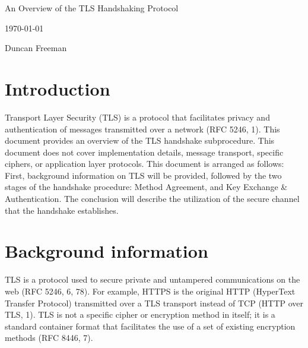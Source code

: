 \documentclass[12pt]{article}
\newcommand{\sectionheaderfmt}[1]{%
    \sffamily\bfseries\strut\color{white}#1
}
\newcommand{\titlebox}[2]{%
    \colorbox{#1}{%
        \sectionheaderfmt{#2}%
}}
\begin{document}
\noindent
\titlebox{sectioncolor}{\large An Overview of the TLS Handshaking Protocol\hspace{5em}}

\medskip
\noindent
\titlebox{sectioncolor}{\large\today}

\medskip
\noindent
\titlebox{sectioncolor}{\large Duncan Freeman}

\thispagestyle{empty}

\newpage


\setcounter{page}{2}

\sffamily\tableofcontents\rmfamily

\newpage


\sffamily\bfseries\listoffigures\rmfamily\mdseries

\newpage



\section{Introduction}
Transport Layer Security (TLS) is a protocol that facilitates privacy and authentication of messages transmitted over a network (RFC 5246, 1). This document provides an overview of the TLS handshake subprocedure. This document does not cover implementation details, message transport, specific ciphers, or application layer protocols. This document is arranged as follows: First, background information on TLS will be provided, followed by the two stages of the handshake procedure: Method Agreement, and Key Exchange \& Authentication. The conclusion will describe the utilization of the secure channel that the handshake establishes. 

\section{Background information}
TLS is a protocol used to secure private and untampered communications on the web (RFC 5246, 6, 78). For example, HTTPS is the original HTTP (HyperText Transfer Protocol) transmitted over a TLS transport instead of TCP (HTTP over TLS, 1). TLS is not a specific cipher or encryption method in itself; it is a standard container format that facilitates the use of a set of existing encryption methods (RFC 8446, 7).
\end{document}
